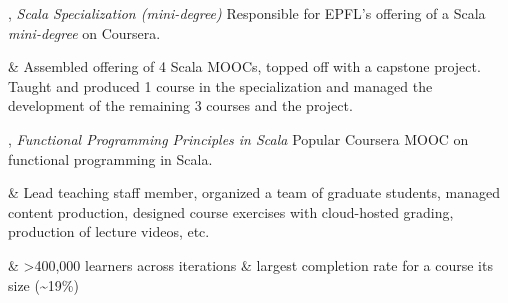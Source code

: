 \documentclass[9pt]{article}
\begin{document}

, {\em Scala Specialization (mini-degree)} 
\newline\noindent Responsible for EPFL's offering of a Scala {\em mini-degree} on Coursera. 
\smallskip
\begin{easylist}[itemize]
& Assembled offering of 4 Scala MOOCs, topped off with a capstone
\newline project. Taught and produced 1 course in the specialization and
\newline managed the development of the remaining 3 courses and the project.
\end{easylist}
\bigskip


, {\em Functional Programming Principles in Scala} 
\newline\noindent Popular Coursera MOOC on functional programming in Scala. 
\smallskip
\begin{easylist}[itemize]
& Lead teaching staff member, organized a team of graduate
\newline students, managed content production, designed course exercises
\newline with cloud-hosted grading, production of lecture videos, etc.

& >400,000 learners across iterations \& largest completion
\newline rate for a course its size (\textasciitilde19\%)
\end{easylist}
\bigskip





\bigskip
{}
\end{document}
